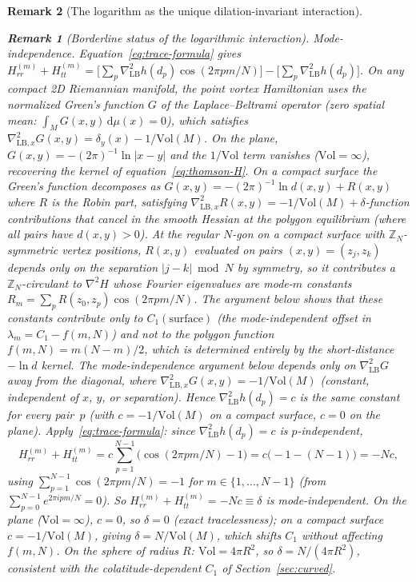 \documentclass[12pt, a4paper]{article}
\newtheorem{remark}{Remark}[section]
\numberwithin{equation}{section}
\newcommand{\dd}{\mathrm{d}}
\begin{document}
\begin{remark}[The logarithm as the unique dilation-invariant interaction]
\begin{remark}[Borderline status of the logarithmic interaction]
\smallskip
\noindent\emph{Mode-independence.}
Equation~\eqref{eq:trace-formula} gives
$H_{rr}^{(m)}+H_{tt}^{(m)}
= \bigl[\sum_p \nabla^2_{\mathrm{LB}} h(d_p)\cos(2\pi pm/N)\bigr]
- \bigl[\sum_p \nabla^2_{\mathrm{LB}} h(d_p)\bigr]$.
On any compact 2D Riemannian manifold, the point vortex
Hamiltonian uses the \emph{normalized} Green's function
$G$ of the Laplace--Beltrami operator (zero spatial mean:
$\int_M G(x,y)\,\dd\mu(x) = 0$), which satisfies
$\nabla^2_{\mathrm{LB},x} G(x,y) = \delta_y(x) - 1/\mathrm{Vol}(M)$.
On the plane, $G(x,y) = -(2\pi)^{-1}\ln|x{-}y|$ and the
$1/\mathrm{Vol}$ term vanishes ($\mathrm{Vol} = \infty$),
recovering the kernel of equation~\eqref{eq:thomson-H}.
On a compact surface the Green's function decomposes as
$G(x,y) = -(2\pi)^{-1}\ln d(x,y) + R(x,y)$
where $R$ is the Robin part, satisfying
$\nabla^2_{\mathrm{LB},x} R(x,y)
 = -1/\mathrm{Vol}(M) + \delta$-function contributions
that cancel in the smooth Hessian at the polygon equilibrium
(where all pairs have $d(x,y) > 0$).  At the regular $N$-gon
on a compact surface with $\mathbb{Z}_N$-symmetric vertex
positions, $R(x,y)$ evaluated on pairs $(x,y) = (z_j, z_k)$
depends only on the separation $|j - k| \bmod N$ by symmetry,
so it contributes a $\mathbb{Z}_N$-circulant to $\nabla^2 H$
whose Fourier eigenvalues are mode-$m$ constants
$R_m = \sum_p R(z_0, z_p)\cos(2\pi pm/N)$.
The argument below shows that these constants contribute
only to $C_1(\text{surface})$ (the mode-independent offset
in $\lambda_m = C_1 - f(m,N)$) and not to the polygon
function $f(m,N) = m(N{-}m)/2$, which is determined
entirely by the short-distance $-\ln d$ kernel.
The mode-independence argument below
depends only on $\nabla^2_{\mathrm{LB}} G$ away from the
diagonal, where
$\nabla^2_{\mathrm{LB},x} G(x,y) = -1/\mathrm{Vol}(M)$
(constant, independent of $x$, $y$, or separation).
Hence $\nabla^2_{\mathrm{LB}} h(d_p) = c$ is the \emph{same
constant} for every pair~$p$ (with $c = -1/\mathrm{Vol}(M)$
on a compact surface, $c = 0$ on the plane).
Apply~\eqref{eq:trace-formula}: since
$\nabla^2_{\mathrm{LB}} h(d_p) = c$ is $p$-independent,
\[
  H_{rr}^{(m)}+H_{tt}^{(m)}
  = c\sum_{p=1}^{N-1}\bigl(\cos(2\pi pm/N) - 1\bigr)
  = c\bigl(-1 - (N{-}1)\bigr)
  = -Nc,
\]
using $\sum_{p=1}^{N-1}\cos(2\pi pm/N) = -1$ for
$m \in \{1,\ldots,N{-}1\}$ (from
$\sum_{p=0}^{N-1}e^{2\pi ipm/N} = 0$).
So $H_{rr}^{(m)}+H_{tt}^{(m)} = -Nc \equiv \delta$ is mode-independent.
On the plane ($\mathrm{Vol} = \infty$), $c = 0$, so $\delta = 0$
(exact tracelessness); on a compact surface $c = -1/\mathrm{Vol}(M)$,
giving $\delta = N/\mathrm{Vol}(M)$, which shifts $C_1$
without affecting $f(m,N)$.  On the sphere of radius $R$:
$\mathrm{Vol} = 4\pi R^2$, so $\delta = N/(4\pi R^2)$,
consistent with the colatitude-dependent $C_1$ of
Section~\ref{sec:curved}.


\end{remark}
\end{remark}
\end{document}
